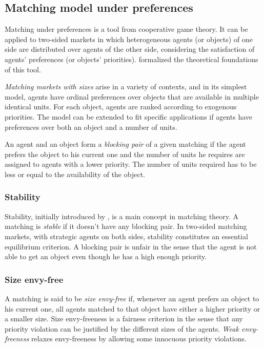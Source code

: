 \subsection{Matching model under preferences}\label{matching-model-under-preferences}%


Matching under preferences is a tool from cooperative game theory. It can be applied to two-sided markets in which heterogeneous agents (or objects) of one side are distributed over agents of the other side, considering the satisfaction of agents’ preferences (or objects’ priorities). \citet{gale_1962} formalized the theoretical foundations of this tool.

\textit{Matching markets with sizes} arise in a variety of contexts, and in its simplest model, agents have ordinal preferences over objects that are available in multiple identical units. For each object, agents are ranked according to exogenous priorities. The model can be extended to fit specific applications if agents have preferences over both an object and a number of units.

An agent and an object form a \textit{blocking pair} of a given matching if the agent prefers the object to his current one and the number of units he requires are assigned to agents with a lower priority. The number of units required has to be less or equal to the availability of the object.


\subsubsection{Stability}%

Stability, initially introduced by \citet{gale_1962}, is a main concept in matching theory. A matching is \textit{stable} if it doesn't have any blocking pair. In two-sided matching markets, with strategic agents on both sides, stability constitutes an essential equilibrium criterion. A blocking pair is unfair in the sense that the agent is not able to get an object even though he has a high enough priority.


\subsubsection{Size envy-free}%

A matching is said to be \textit{size envy-free} if, whenever an agent prefers an object to his current one, all agents matched to that object have either a higher priority or a smaller size. Size envy-freeness is a fairness criterion in the sense that any priority violation can be justified by the different sizes of the agents. \textit{Weak envy-freeness} relaxes envy-freeness by allowing some innocuous priority violations.


